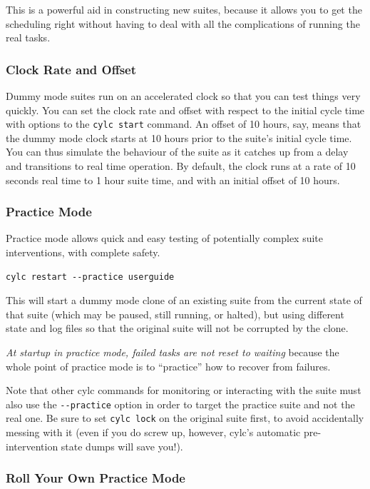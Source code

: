 \documentclass[11pt,a4paper]{article}
\begin{document}
This is a powerful aid in constructing new suites, because it allows
you to get the scheduling right without having to deal with all the
complications of running the real tasks.

\subsubsection{Clock Rate and Offset}

Dummy mode suites run on an accelerated clock so that you can test
things very quickly. You can set the clock rate and offset with respect
to the initial cycle time with options to the \lstinline=cylc start=
command. An offset of 10 hours, say, means that the dummy mode clock
starts at 10 hours prior to the suite's initial cycle time.  You can
thus simulate the behaviour of the suite as it catches up from a delay
and transitions to real time operation.  By default, the clock runs at a
rate of 10 seconds real time to 1 hour suite time, and with an initial
offset of 10 hours. 

\subsubsection{Practice Mode}

Practice mode allows quick and easy testing of potentially complex
suite interventions, with complete safety.

\begin{lstlisting}
cylc restart --practice userguide
\end{lstlisting}

This will start a dummy mode clone of an existing suite from the
current state of that suite (which may be paused, still running, or
halted), but using different state and log files so that the original
suite will not be corrupted by the clone.

{\em At startup in practice mode, failed tasks are not reset to waiting}
because the whole point of practice mode is to ``practice'' how to
recover from failures.

Note that other cylc commands for monitoring or interacting with the
suite must also use the \lstinline=--practice= option in order to
target the practice suite and not the real one. Be sure to set
\lstinline=cylc lock= on the original suite first, to avoid
accidentally messing with it (even if you do screw up, however, cylc's
automatic pre-intervention state dumps will save you!).


\subsubsection{Roll Your Own Practice Mode}
\end{document}
